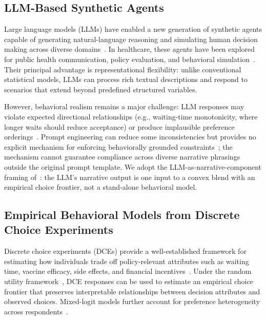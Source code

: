 \documentclass[11pt]{article}
\begin{document}
\subsection{LLM-Based Synthetic Agents}

Large language models (LLMs) have enabled a new generation of synthetic agents capable of generating natural-language reasoning and simulating human decision making across diverse domains~\citep{Bommasani2021, Park2023a, Mu2024}. In healthcare, these agents have been explored for public health communication, policy evaluation, and behavioral simulation~\citep{Sehgal2025, Gullison2025}. Their principal advantage is representational flexibility: unlike conventional statistical models, LLMs can process rich textual descriptions and respond to scenarios that extend beyond predefined structured variables.

However, behavioral realism remains a major challenge: LLM responses may violate expected directional relationships (e.g., waiting-time monotonicity, where longer waits should reduce acceptance) or produce implausible preference orderings~\citep{Aher2022TuringExperiments, Horton2023, hintze2025nonlinear}. Prompt engineering can reduce some inconsistencies but provides no explicit mechanism for enforcing behaviorally grounded constraints~\citep{wang2025simulate, wang2025heating}; the mechanism cannot guarantee compliance across diverse narrative phrasings outside the original prompt template. We adopt the LLM-as-narrative-component framing of~\citet{Argyle2023, Horton2023}: the LLM's narrative output is one input to a convex blend with an empirical choice frontier, not a stand-alone behavioral model.

\subsection{Empirical Behavioral Models from Discrete Choice Experiments}

Discrete choice experiments (DCEs) provide a well-established framework for estimating how individuals trade off policy-relevant attributes such as waiting time, vaccine efficacy, side effects, and financial incentives~\citep{Soekhai2019a, Chan2024}. Under the random utility framework~\citep{Train2009, louviere2000stated}, DCE responses can be used to estimate an empirical choice frontier that preserves interpretable relationships between decision attributes and observed choices. Mixed-logit models further account for preference heterogeneity across respondents~\citep{hensher2003mixed, hensher2015applied}.
\end{document}
